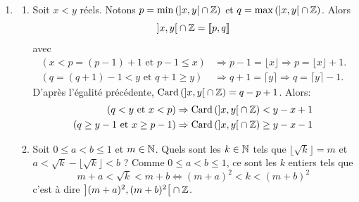 \begin{enumerate}
  \item
  \begin{enumerate}
    \item Soit $x < y$ réels. Notons $p = \min\left( \left] x, y \right[ \cap \mathbb{Z} \right)$ et $q = \max\left( \left] x, y \right[ \cap \mathbb{Z} \right)$. Alors 
\[
  \left] x, y \right[ \cap \mathbb{Z} = \llbracket p, q \rrbracket
\]
avec 
\[
\begin{aligned}
\left(x < p = (p-1) + 1 \text{ et } p-1 \leq x \right) &\Rightarrow p-1 = \lfloor x \rfloor \Rightarrow p = \lfloor x \rfloor +1 .\\
\left(q = (q+1) - 1 < y \text{ et } q + 1 \geq y \right) &\Rightarrow q+1 = \lceil y \rceil  \Rightarrow q = \lceil y \rceil -1 .
\end{aligned} 
\]
D'après l'égalité précédente, $\operatorname{Card}\left(\left] x, y \right[ \cap \mathbb{Z}\right) = q - p +1$. Alors:
\[
  \begin{aligned}
    \left( q < y \text{ et } x < p \right) &\Rightarrow \operatorname{Card}\left(\left] x, y \right[ \cap \mathbb{Z}\right) < y - x + 1 \\
    \left( q \geq y - 1 \text{ et } x \geq p -1 \right) &\Rightarrow \operatorname{Card}\left(\left] x, y \right[ \cap \mathbb{Z}\right) \geq y - x -1
  \end{aligned}
\]

    \item Soit $0 \leq a < b \leq 1$ et $m \in \mathbb{N}$.\newline
    Quels sont les $k\in \mathbb{N}$ tels que $\lfloor \sqrt{k} \rfloor = m$ et $a < \sqrt{k} - \lfloor \sqrt{k} \rfloor < b$ ?\newline 
Comme $0 \leq a < b \leq 1$, ce sont les $k$ entiers tels que  
\[
  m + a < \sqrt{k} < m + b \Leftrightarrow (m+a)^2 < k < (m+b)^2
\]
c'est à dire $\left] (m+a)^2 , (m+b)^2 \right[ \cap \mathbb{Z}$.


\end{enumerate}
\end{enumerate}
